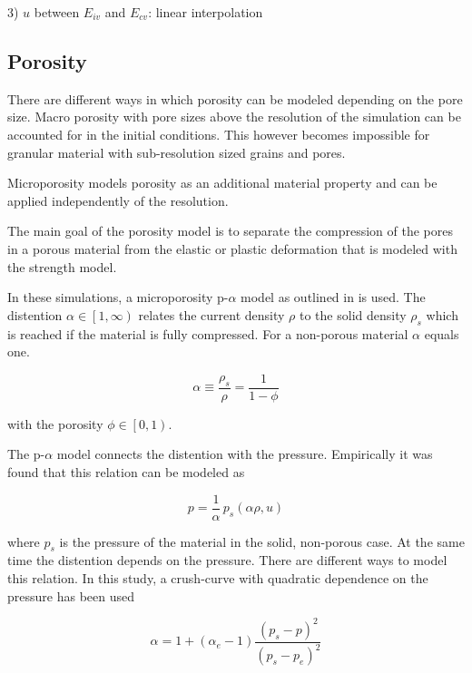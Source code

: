 3) $u$ between $E_{iv}$ and $E_{cv}$: linear interpolation


\subsection{Porosity}
There are different ways in which porosity can be modeled depending on the pore size. Macro porosity with pore sizes above the resolution of the simulation can be accounted for in the initial conditions. This however becomes impossible for granular material with sub-resolution sized grains and pores.

Microporosity models porosity as an additional material property and can be applied independently of the resolution.

The main goal of the porosity model is to separate the compression of the pores in a porous material from the elastic or plastic deformation that is modeled with the strength model.

In these simulations, a microporosity p-$\alpha$ model as outlined in \cite{Jutzi_2008} is used. The distention $\alpha \in \left[1,\infty\right)$ relates the current density $\rho$ to the solid density $\rho_s$ which is reached if the material is fully compressed. For a non-porous material $\alpha$ equals one.

\begin{equation}
    \alpha \equiv \frac{\rho_s}{\rho} = \frac{1}{1 - \phi}
\end{equation}

with the porosity $\phi \in \left[0, 1\right)$.

The p-$\alpha$ model connects the distention with the pressure. Empirically it was found \cite{Carroll_1972} that this relation can be modeled as

\begin{equation}
    p = \frac{1}{\alpha}\,p_s(\alpha\rho, u)
\end{equation}

where $p_s$ is the pressure of the material in the solid, non-porous case. At the same time the distention depends on the pressure. There are different ways to model this relation. In this study, a crush-curve with quadratic dependence on the pressure has been used

\begin{equation}
    \alpha = 1 + \left(\alpha_e - 1 \right) \frac{\left(p_s - p\right)^2}{\left(p_s - p_e\right)^2}
\end{equation}

